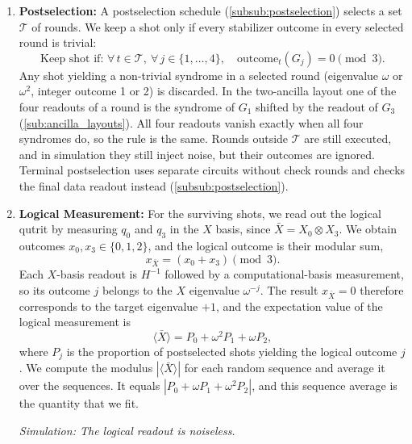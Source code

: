 \begin{enumerate}
    \item \textbf{Postselection:} A postselection schedule (\autoref{subsub:postselection}) selects a set $\mathcal{T}$ of rounds. We keep a shot only if every stabilizer outcome in every selected round is trivial:
    \begin{equation}
        \text{Keep shot if: } \forall\, t \in \mathcal{T},\ \forall\, j \in \{1, \dots, 4\}, \quad \text{outcome}_t(G_j) = 0 \pmod 3 .
    \end{equation}
    Any shot yielding a non-trivial syndrome in a selected round (eigenvalue $\omega$ or $\omega^2$, integer outcome 1 or 2) is discarded. In the two-ancilla layout one of the four readouts of a round is the syndrome of $G_1$ shifted by the readout of $G_3$ (\autoref{sub:ancilla_layouts}). All four readouts vanish exactly when all four syndromes do, so the rule is the same. Rounds outside $\mathcal{T}$ are still executed, and in simulation they still inject noise, but their outcomes are ignored. Terminal postselection uses separate circuits without check rounds and checks the final data readout instead (\autoref{subsub:postselection}).

    \item \textbf{Logical Measurement:} For the surviving shots, we read out the logical qutrit by measuring $q_0$ and $q_3$ in the $X$ basis, since $\bar{X} = X_0 \otimes X_3$. We obtain outcomes $x_0, x_3 \in \{0, 1, 2\}$, and the logical outcome is their modular sum,
    \begin{equation}
        x_{\bar{X}} = (x_0 + x_3) \pmod 3 .
    \end{equation}
    Each $X$-basis readout is $H^{-1}$ followed by a computational-basis measurement, so its outcome $j$ belongs to the $X$ eigenvalue $\omega^{-j}$. The result $x_{\bar{X}}=0$ therefore corresponds to the target eigenvalue $+1$, and the expectation value of the logical measurement is
    \begin{equation}
        \langle \bar{X} \rangle = P_0 + \omega^{2} P_1 + \omega P_2,
    \end{equation}
    where $P_j$ is the proportion of postselected shots yielding the logical outcome $j$. We compute the modulus $|\langle \bar{X} \rangle|$ for each random sequence and average it over the sequences. It equals $|P_0 + \omega P_1 + \omega^2 P_2|$, and this sequence average is the quantity that we fit.

    \textit{Simulation: The logical readout is noiseless.}
\end{enumerate}

